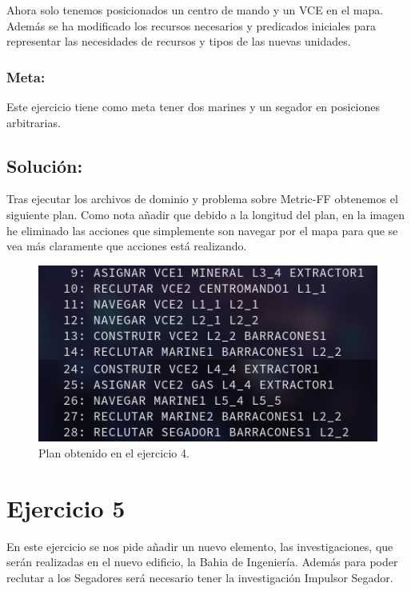 \documentclass[10pt, spanish]{article}
\begin{document}
Ahora solo tenemos posicionados un centro de mando y un VCE en el mapa. Además se ha modificado los recursos necesarios y predicados iniciales para representar las necesidades de recursos y tipos de las nuevas unidades.

\subsubsection{Meta:}

Este ejercicio tiene como meta tener dos marines y un segador en posiciones arbitrarias.

\subsection{Solución:}

Tras ejecutar los archivos de dominio y problema sobre Metric-FF obtenemos el siguiente plan. Como nota añadir que debido a la longitud del plan, en la imagen he eliminado las acciones que simplemente son navegar por el mapa para que se vea más claramente que acciones está realizando.

\begin{figure}[H]
	\centering
	\includegraphics[scale=0.4]{plan4.png}
	\caption{Plan obtenido en el ejercicio 4.}
	\label{plan4}
\end{figure}








\section{Ejercicio 5}

En este ejercicio se nos pide añadir un nuevo elemento, las investigaciones, que serán realizadas en el nuevo edificio, la Bahia de Ingeniería. Además para poder reclutar a los Segadores será necesario tener la investigación Impulsor Segador.
\end{document}
